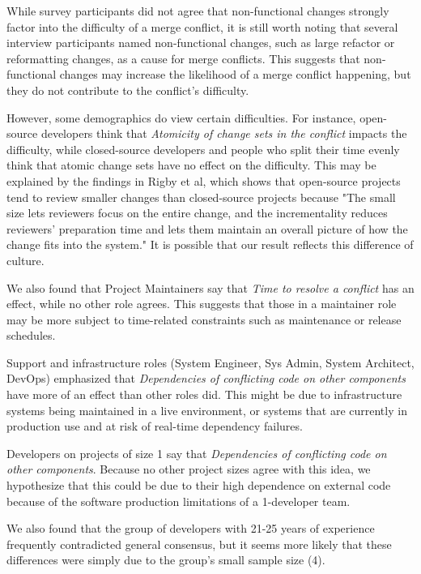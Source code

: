 While survey participants did not agree that non-functional changes strongly factor into the difficulty of a merge conflict, it is still worth noting that several interview participants named non-functional changes, such as large refactor or reformatting changes, as a cause for merge conflicts. This suggests that non-functional changes may increase the likelihood of a merge conflict happening, but they do not contribute to the conflict's difficulty.

However, some demographics do view certain difficulties. For instance, open-source developers think that \textit{Atomicity of change sets in the conflict} impacts the difficulty, while closed-source developers and people who split their time evenly think that atomic change sets have no effect on the difficulty. This may be explained by the findings in Rigby et al\cite{OSS_smaller_commits}, which shows that open-source projects tend to review smaller changes than closed-source projects because "The small size lets reviewers focus on the entire change, and the incrementality reduces reviewers’ preparation time and lets them maintain an overall picture of how the change fits into the system." It is possible that our result reflects this difference of culture.

We also found that Project Maintainers say that \textit{Time to resolve a conflict} has an effect, while no other role agrees. This suggests that those in a maintainer role may be more subject to time-related constraints such as maintenance or release schedules. 


Support and infrastructure roles (System Engineer, Sys Admin, System Architect, DevOps) emphasized that \textit{Dependencies of conflicting code on other components} have more of an effect than other roles did. This might be due to infrastructure systems being maintained in a live environment, or systems that are currently in production use and at risk of real-time dependency failures. 

Developers on projects of size 1 say that \textit{Dependencies of conflicting code on other components}. Because no other project sizes agree with this idea, we hypothesize that this could be due to their high dependence on external code because of the software production limitations of a 1-developer team.

We also found that the group of developers with 21-25 years of experience frequently contradicted general consensus, but it seems more likely that these differences were simply due to the group's small sample size (4).

